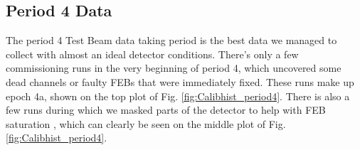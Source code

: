 \FloatBarrier
\subsection{Period 4 Data}\label{sec:TBPeriod4}

The period 4 Test Beam data taking period is the best data we managed to collect with almost an ideal detector conditions. There's only a few commissioning runs in the very beginning of period 4, which uncovered some dead channels or faulty FEBs that were immediately fixed. These runs make up epoch 4a, shown on the top plot of Fig. \ref{fig:Calibhist_period4}. There is also a few runs during which we masked parts of the detector to help with FEB saturation \cite{NOVA-doc-53658}, which can clearly be seen on the middle plot of Fig. \ref{fig:Calibhist_period4}.


